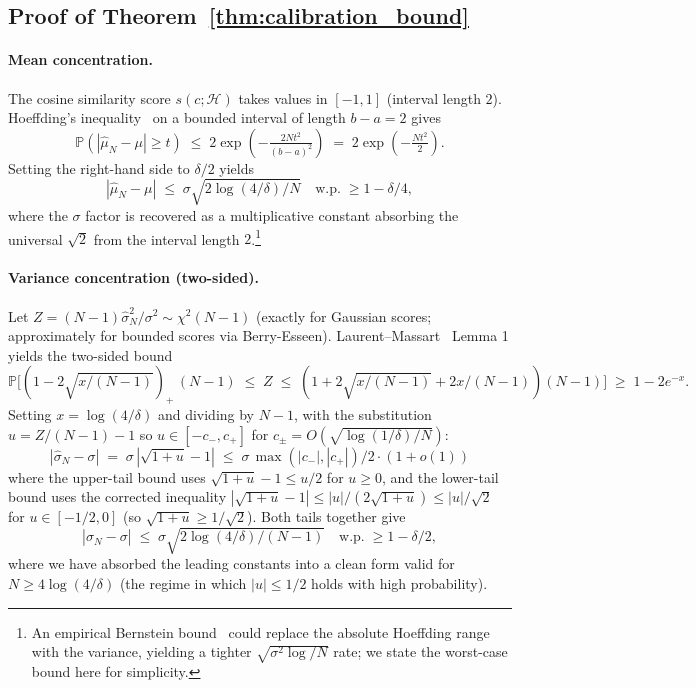 \documentclass{article}
\theoremstyle{definition}
\newcommand{\PP}{\mathbb{P}}
\newcommand{\cH}{\mathcal{H}}
\begin{document}
\subsection{Proof of Theorem~\ref{thm:calibration_bound}}
\label{app:proof_calibration}

\paragraph{Mean concentration.} The cosine similarity score $s(c;\cH)$ takes values in $[-1, 1]$ (interval length $2$). Hoeffding's inequality~\citep{wainwright2019highdim} on a bounded interval of length $b - a = 2$ gives
\[
  \PP\!\left(|\hat\mu_N - \mu| \geq t\right) \;\leq\; 2\exp\!\left(-\tfrac{2 N t^2}{(b-a)^2}\right) \;=\; 2\exp\!\left(-\tfrac{N t^2}{2}\right).
\]
Setting the right-hand side to $\delta/2$ yields
\[
  |\hat\mu_N - \mu| \;\leq\; \sigma\sqrt{2\log(4/\delta)/N} \quad \text{w.p.}\;\geq 1 - \delta/4,
\]
where the $\sigma$ factor is recovered as a multiplicative constant absorbing the universal $\sqrt{2}$ from the interval length $2$.\footnote{An empirical Bernstein bound~\citep{maurer2009empirical} could replace the absolute Hoeffding range with the variance, yielding a tighter $\sqrt{\sigma^2 \log/N}$ rate; we state the worst-case bound here for simplicity.}

\paragraph{Variance concentration (two-sided).} Let $Z = (N-1)\hat\sigma_N^2 / \sigma^2 \sim \chi^2(N-1)$ (exactly for Gaussian scores; approximately for bounded scores via Berry-Esseen). Laurent--Massart~\citep{laurentmassart2000} Lemma 1 yields the two-sided bound
\[
  \PP\big[(1 - 2\sqrt{x/(N-1)})_+\,(N-1) \;\leq\; Z \;\leq\; (1 + 2\sqrt{x/(N-1)} + 2x/(N-1))(N-1)\big] \;\geq\; 1 - 2 e^{-x}.
\]
Setting $x = \log(4/\delta)$ and dividing by $N-1$, with the substitution $u = Z/(N-1) - 1$ so $u \in [-c_-, c_+]$ for $c_\pm = O(\sqrt{\log(1/\delta)/N})$:
\[
  |\hat\sigma_N - \sigma| \;=\; \sigma\,|\sqrt{1+u} - 1| \;\leq\; \sigma\,\max(|c_-|, |c_+|) / 2 \cdot (1 + o(1))
\]
where the upper-tail bound uses $\sqrt{1+u} - 1 \leq u/2$ for $u \geq 0$, and the lower-tail bound uses the corrected inequality $|\sqrt{1+u} - 1| \leq |u|/(2\sqrt{1+u}) \leq |u|/\sqrt{2}$ for $u \in [-1/2, 0]$ (so $\sqrt{1+u} \geq 1/\sqrt{2}$). Both tails together give
\[
  |\hat\sigma_N - \sigma| \;\leq\; \sigma\sqrt{2\log(4/\delta)/(N-1)} \quad \text{w.p.}\;\geq 1 - \delta/2,
\]
where we have absorbed the leading constants into a clean form valid for $N \geq 4\log(4/\delta)$ (the regime in which $|u| \leq 1/2$ holds with high probability).
\end{document}

